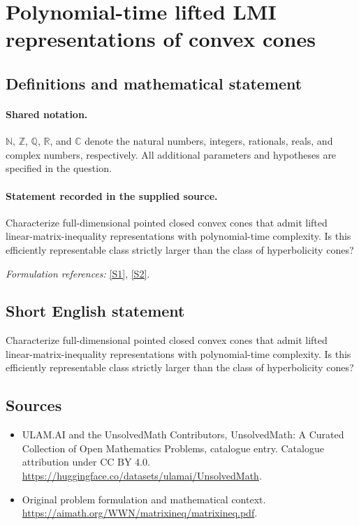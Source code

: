 \documentclass[11pt]{article}
\newcommand{\sref}[2]{\hyperlink{source:#1:#2}{[S#2]}}
\begin{document}
\section{Polynomial-time lifted LMI representations of convex cones}\label{statement}

\subsection{Definitions and mathematical statement}

\paragraph{Shared notation.}$\mathbb N$, $\mathbb Z$, $\mathbb Q$, $\mathbb R$, and $\mathbb C$ denote the natural numbers, integers, rationals, reals, and complex numbers, respectively. All additional parameters and hypotheses are specified in the question.


\paragraph{Statement recorded in the supplied source.}
Characterize full-dimensional pointed closed convex cones that admit lifted linear-matrix-inequality representations with polynomial-time complexity. Is this efficiently representable class strictly larger than the class of hyperbolicity cones?
\par\smallskip\textit{Formulation references:} \sref{statement}{1}, \sref{statement}{2}.
\subsection{Short English statement}
Characterize full-dimensional pointed closed convex cones that admit lifted linear-matrix-inequality representations with polynomial-time complexity. Is this efficiently representable class strictly larger than the class of hyperbolicity cones?
\subsection{Sources}
\begin{itemize}
\item[\hypertarget{source:statement:1}{S1}] ULAM.AI and the UnsolvedMath Contributors, UnsolvedMath: A Curated Collection of Open Mathematics Problems, catalogue entry. Catalogue attribution under CC BY 4.0.
\url{https://huggingface.co/datasets/ulamai/UnsolvedMath}.
\item[\hypertarget{source:statement:2}{S2}] Original problem formulation and mathematical context.
\url{https://aimath.org/WWN/matrixineq/matrixineq.pdf}.
\end{itemize}
\label{end:statement}
\end{document}

